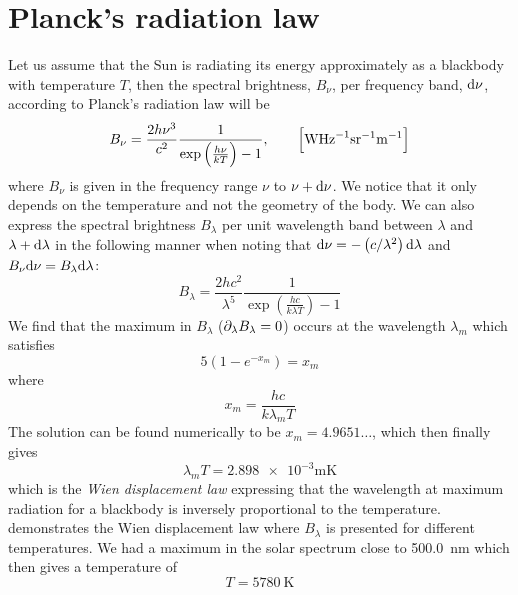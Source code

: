\section{Planck's radiation law}
Let us assume that the Sun is radiating its energy approximately as a blackbody with temperature \(T\), then the spectral brightness, \(B_\nu \), per frequency band, \(\tn{d}\nu \), according to Planck's radiation law will be
\begin{equation*}
    B_\nu=\frac{2h\nu^3}{c^2}\frac{1}{\exp\left(\frac{h\nu}{kT}\right)-1},\qquad \left[\si{\watt\hertz^{-1}}\tn{sr}^{-1}\si{\metre^{-1}}\right]
\end{equation*}
where \(B_\nu \) is given in the frequency range \(\nu \) to \(\nu+\tn{d}\nu \). We notice that it only depends on the temperature and not the geometry of the body. We can also express the spectral brightness \(B_\lambda \) per unit wavelength band between \(\lambda \) and \(\lambda+\tn{d}\lambda \) in the following manner when noting that \(\tn{d}\nu=-\left(c/\lambda^2\right)\tn{d}\lambda \) and \(B_\nu\tn{d}\nu=B_\lambda\tn{d}\lambda \):
\begin{equation*}
    B_\lambda=\frac{2hc^2}{\lambda^5}\frac{1}{\exp\left(\frac{hc}{k\lambda T}\right)-1}
\end{equation*}
We find that the maximum in \(B_\lambda \) (\(\p{\lambda}{B_\lambda}=0\)) occurs at the wavelength \(\lambda_m\) which satisfies
\begin{equation*}
    5\left(1-e^{-x_m}\right)=x_m
\end{equation*}
where
\begin{equation*}
    x_m=\frac{hc}{k\lambda_m T}
\end{equation*}
The solution can be found numerically to be \(x_m=4.9651\dots \), which then finally gives
\begin{equation*}
    \lambda_{m}T=\num{2.898e-3}\si{\metre\kelvin}
\end{equation*}
which is the \emph{Wien displacement law} expressing that the wavelength at maximum radiation for a blackbody is inversely proportional to the temperature.  demonstrates the Wien displacement law where \(B_\lambda \) is presented for different temperatures. We had a maximum in the solar spectrum close to \SI{500.0}{\nano\metre} which then gives a temperature of
\begin{equation*}
    T=\SI{5780}{\kelvin}
\end{equation*}

